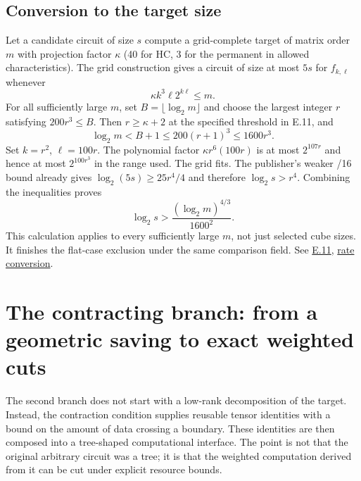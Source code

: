 \documentclass[11pt,letterpaper]{article}
\theoremstyle{definition}\newtheorem{definition}[theorem]{Definition}\newtheorem{example}[theorem]{Example}
\theoremstyle{remark}\newtheorem{remark}[theorem]{Remark}
\newcommand{\pub}[3]{\href{https://github.com/anthropics/formal-math/blob/11b6c7e3c927df2658f513b6b68ea7f8929c62c5/vp-vnp/#1\#L#2}{#3}}
\newcommand{\aud}[2]{\href{https://github.com/nousentllc/VP-VNP-Review/blob/567303d0bcf4f9d54390437b137752446e58ccd6/#1}{#2}}
\begin{document}
\subsection{Conversion to the target size}\label{sec:flatconvert}
Let a candidate circuit of size $s$ compute a grid-complete target of matrix order $m$ with projection factor $\kappa$ (40 for HC, 3 for the permanent in allowed characteristics). The grid construction gives a circuit of size at most $5s$ for $f_{k,\ell}$ whenever
\[
 \kappa k^3\ell 2^{k\ell}\le m.
\]
For all sufficiently large $m$, set $B=\lfloor\log_2m\rfloor$ and choose the largest integer $r$ satisfying $200r^3\le B$. Then $r\ge\kappa+2$ at the specified threshold in E.11, and
\[
 \log_2m< B+1\le200(r+1)^3\le1600r^3.
\]
Set $k=r^2$, $\ell=100r$. The polynomial factor $\kappa r^6(100r)$ is at most $2^{107r}$ and hence at most $2^{100r^3}$ in the range used. The grid fits. The publisher's weaker /16 bound already gives $\log_2(5s)\ge25r^4/4$ and therefore $\log_2s>r^4$. Combining the inequalities proves
\[
 \log_2s>\frac{(\log_2m)^{4/3}}{1600^2}.
\]
This calculation applies to every sufficiently large $m$, not just selected cube sizes. It finishes the flat-case exclusion under the same comparison field. See \pub{Paper/Rate.lean}{337}{E.11}, \aud{passes/14a-flat.md}{rate conversion}.

\section{The contracting branch: from a geometric saving to exact weighted cuts}\label{sec:contract}
The second branch does not start with a low-rank decomposition of the target. Instead, the contraction condition supplies reusable tensor identities with a bound on the amount of data crossing a boundary. These identities are then composed into a tree-shaped computational interface. The point is not that the original arbitrary circuit was a tree; it is that the weighted computation derived from it can be cut under explicit resource bounds.
\end{document}
